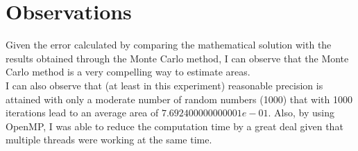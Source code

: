 \documentclass{article}
\begin{document}
\section{Observations}
Given the error calculated by comparing the mathematical solution with the results obtained through the Monte Carlo method, I can observe that the Monte Carlo method is a very compelling way to estimate areas.\\

I can also observe that (at least in this experiment) reasonable precision is attained with only a moderate number of random numbers (1000) that with 1000 iterations lead to an average area of $7.692400000000001e-01$. Also, by using OpenMP, I was able to reduce the computation time by a great deal given that multiple threads were working at the same time.
\end{document}
